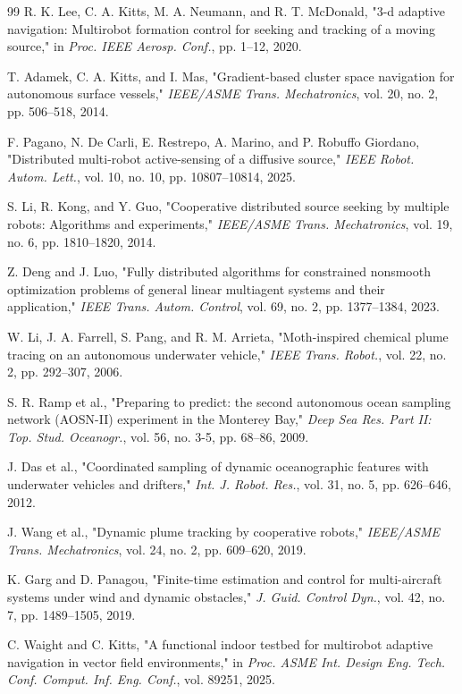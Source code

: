 \documentclass[lettersize,journal]{IEEEtran}
\begin{document}
\begin{thebibliography}{99}
 R. K. Lee, C. A. Kitts, M. A. Neumann, and R. T. McDonald, "3-d adaptive navigation: Multirobot formation control for seeking and tracking of a moving source," in \textit{Proc. IEEE Aerosp. Conf.}, pp. 1--12, 2020.

 T. Adamek, C. A. Kitts, and I. Mas, "Gradient-based cluster space navigation for autonomous surface vessels," \textit{IEEE/ASME Trans. Mechatronics}, vol. 20, no. 2, pp. 506--518, 2014.

 F. Pagano, N. De Carli, E. Restrepo, A. Marino, and P. Robuffo Giordano, "Distributed multi-robot active-sensing of a diffusive source," \textit{IEEE Robot. Autom. Lett.}, vol. 10, no. 10, pp. 10807--10814, 2025.

 S. Li, R. Kong, and Y. Guo, "Cooperative distributed source seeking by multiple robots: Algorithms and experiments," \textit{IEEE/ASME Trans. Mechatronics}, vol. 19, no. 6, pp. 1810--1820, 2014.

 Z. Deng and J. Luo, "Fully distributed algorithms for constrained nonsmooth optimization problems of general linear multiagent systems and their application," \textit{IEEE Trans. Autom. Control}, vol. 69, no. 2, pp. 1377--1384, 2023.

 W. Li, J. A. Farrell, S. Pang, and R. M. Arrieta, "Moth-inspired chemical plume tracing on an autonomous underwater vehicle," \textit{IEEE Trans. Robot.}, vol. 22, no. 2, pp. 292--307, 2006.

 S. R. Ramp et al., "Preparing to predict: the second autonomous ocean sampling network (AOSN-II) experiment in the Monterey Bay," \textit{Deep Sea Res. Part II: Top. Stud. Oceanogr.}, vol. 56, no. 3-5, pp. 68--86, 2009.

 J. Das et al., "Coordinated sampling of dynamic oceanographic features with underwater vehicles and drifters," \textit{Int. J. Robot. Res.}, vol. 31, no. 5, pp. 626--646, 2012.

 J. Wang et al., "Dynamic plume tracking by cooperative robots," \textit{IEEE/ASME Trans. Mechatronics}, vol. 24, no. 2, pp. 609--620, 2019.

 K. Garg and D. Panagou, "Finite-time estimation and control for multi-aircraft systems under wind and dynamic obstacles," \textit{J. Guid. Control Dyn.}, vol. 42, no. 7, pp. 1489--1505, 2019.

 C. Waight and C. Kitts, "A functional indoor testbed for multirobot adaptive navigation in vector field environments," in \textit{Proc. ASME Int. Design Eng. Tech. Conf. Comput. Inf. Eng. Conf.}, vol. 89251, 2025.


\end{thebibliography}
\end{document}
